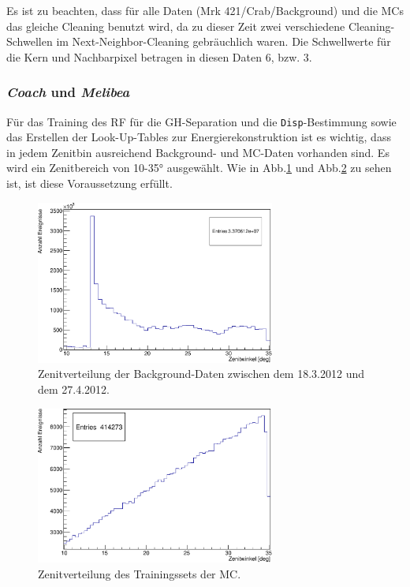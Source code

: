 Es ist zu beachten, dass für alle Daten (Mrk 421/Crab/Background) und die MCs das gleiche Cleaning benutzt wird, da zu dieser Zeit zwei verschiedene Cleaning-Schwellen im Next-Neighbor-Cleaning gebräuchlich waren.
Die Schwellwerte für die Kern und Nachbarpixel betragen in diesen Daten 6, bzw. 3.


\subsubsection{\textit{Coach} und \textit{Melibea}}
Für das Training des RF für die GH-Separation und die \texttt{Disp}-Bestimmung sowie das Erstellen der Look-Up-Tables zur Energierekonstruktion ist es wichtig, dass in jedem Zenitbin ausreichend Background- und MC-Daten vorhanden sind.
Es wird ein Zenitbereich von 10-35° ausgewählt.
Wie in Abb.\ref{Datenset2_Zenitverteilung_Off} und Abb.\ref{Datenset2_Zenitverteilung_MC} zu sehen ist, ist diese Voraussetzung erfüllt.

\begin{figure}
    \centering
    \includegraphics[width=0.7\textwidth]{./Plots/04_MrkAnalyse/Datenset2/Datenset2_Background_MPointingPos1_fZd.pdf}
    \caption{Zenitverteilung der Background-Daten zwischen dem 18.3.2012 und dem 27.4.2012.}
    \label{Datenset2_Zenitverteilung_Off}
\end{figure}

\begin{figure}
    \centering
    \includegraphics[width=0.7\textwidth]{./Plots/04_MrkAnalyse/Datenset2/Datenset2_MC_MPointingPos1_fZd.pdf}
    \caption{Zenitverteilung des Trainingssets der MC.}
    \label{Datenset2_Zenitverteilung_MC}
\end{figure}

